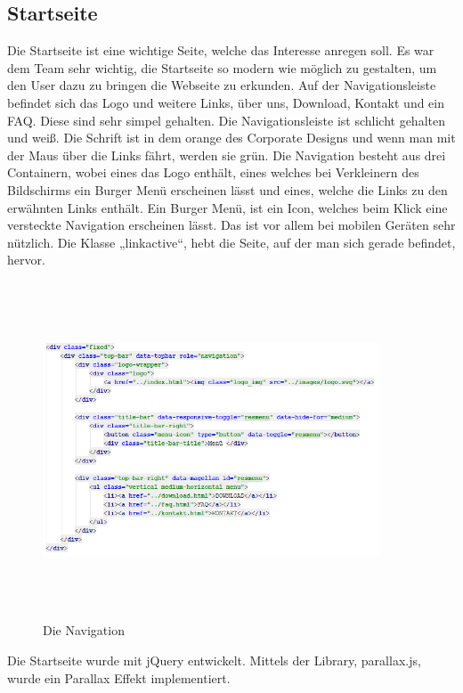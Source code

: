 \subsection{Startseite}
Die Startseite ist eine wichtige Seite, welche das Interesse anregen soll. Es war dem Team sehr wichtig, die Startseite so modern wie möglich zu gestalten, um den User dazu zu bringen die Webseite zu erkunden. Auf der Navigationsleiste befindet sich das Logo und weitere Links, über uns, Download, Kontakt und ein FAQ. Diese sind sehr simpel gehalten. Die Navigationsleiste ist schlicht gehalten und weiß. Die Schrift ist in dem orange des Corporate Designs und wenn man mit der Maus über die Links fährt, werden sie grün. Die Navigation besteht aus drei Containern, wobei eines das Logo enthält, eines welches bei Verkleinern des Bildschirms ein Burger Menü erscheinen lässt und eines, welche die Links zu den erwähnten Links enthält. Ein Burger Menü, ist ein Icon, welches beim Klick eine versteckte Navigation erscheinen lässt. Das ist vor allem bei mobilen Geräten sehr nützlich.  Die Klasse „linkactive“, hebt die Seite, auf der man sich gerade befindet, hervor. 
\begin{figure}[H]
	\centering				\includegraphics[width=10cm,height=10cm,keepaspectratio]{webseite_abb4} 
	\caption{Die Navigation}
\end{figure}
Die Startseite wurde mit jQuery entwickelt. Mittels der Library, parallax.js, wurde ein Parallax Effekt implementiert. 
